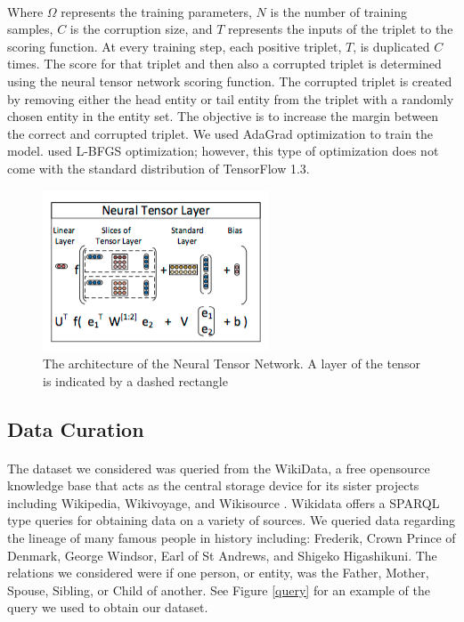 \documentclass[11.5pt]{article}
\newcounter{Figure}
\newcounter{graphics}
\begin{document}
\paragraph{}  Where $ \Omega $ represents the training parameters, $N$ is the number of training samples, $C$ is the corruption size, and $T$ represents the inputs of the triplet to the scoring function. At every training step, each positive triplet, $T$, is duplicated $C$ times. The score for that triplet and then also a corrupted triplet is determined using the neural tensor network scoring function. The corrupted triplet is created by removing either the head entity or tail entity from the triplet with a randomly chosen entity in the entity set. The objective is to increase the margin between the correct and corrupted triplet. We used AdaGrad optimization to train the model. \cite{socher2013reasoning} used L-BFGS optimization; however, this type of optimization does not come with the standard distribution of TensorFlow 1.3.

 \begin{figure}[h!]
\centerline { \includegraphics[width=.6\textwidth]{report_ntn/ntn_arch.png}}
  \caption{\small The architecture of the Neural Tensor Network. A layer of the tensor is indicated by a dashed rectangle}
  \label{ntn_arch.png}
\end{figure}

\subsection{Data Curation}


\paragraph{} The dataset we considered was queried from the WikiData, a free opensource knowledge base that acts as the central storage device for its sister projects including Wikipedia, Wikivoyage, and Wikisource \cite{Wikidata}. Wikidata offers a SPARQL type queries for obtaining data on a variety of sources. We queried data regarding the lineage of many famous people in history including: Frederik, Crown Prince of Denmark, George Windsor, Earl of St Andrews, and Shigeko Higashikuni. The relations we considered were if one person, or entity, was the Father, Mother, Spouse, Sibling, or Child of another. See Figure \ref{query} for an example of the query we used to obtain our dataset. 
\end{document}

